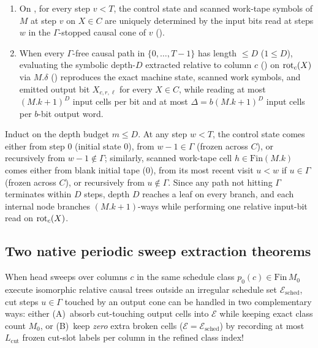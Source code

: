 \begin{lemma}\label{lem:tm-cut-cone}
\begin{enumerate}[label=(\alph*)]
\item On , for every step $v < T$, the control state and scanned
  work-tape symbols of $M$ at step $v$ on $X \in C$ are uniquely determined by the input bits read
  at steps $w$ in the $\Gamma$-stopped causal cone of $v$ ().
\item When every $\Gamma$-free causal path in $\{0,\dots,T-1\}$ has length $\le D$ ($1 \le D$),
  evaluating the symbolic depth-$D$  extracted relative to column $c$
  () on $\operatorname{rot}_c(X)$ via $M.\delta$ () reproduces the exact
  machine state, scanned work symbols, and emitted output bit $X_{c,r,\ell}$ for every $X \in C$,
  while reading at most $(M.k + 1)^D$ input cells per bit and at most
  $\Delta = b(M.k + 1)^D$ input cells per $b$-bit output word.
\end{enumerate}
\end{lemma}
\begin{outline}
Induct on the depth budget $m \le D$. At any step $w < T$, the control state comes either from step
$0$ (initial state $0$), from $w - 1 \in \Gamma$ (frozen across $C$), or recursively from $w - 1
\notin \Gamma$; similarly, scanned work-tape cell $h \in \mathrm{Fin}(M.k)$ comes either from blank
initial tape ($0$), from its most recent visit $u < w$ if $u \in \Gamma$ (frozen across $C$), or
recursively from $u \notin \Gamma$. Since any path not hitting $\Gamma$ terminates within $D$ steps,
depth $D$ reaches a leaf on every branch, and each internal node branches $(M.k + 1)$-ways while
performing one relative input-bit read on $\operatorname{rot}_c(X)$.
\end{outline}

\subsection{Two native periodic sweep extraction theorems}\label{sec:sweep-theorems}

When head sweeps over columns $c$ in the same schedule class $p_0(c) \in \mathrm{Fin}\,M_0$ execute
isomorphic relative causal trees outside an irregular schedule set $\mathcal{E}_{\mathrm{sched}}$,
cut steps $u \in \Gamma$ touched by an output cone can be handled in two complementary ways:
either (A)~absorb cut-touching output cells into $\mathcal{E}$ while keeping exact class count
$M_0$, or (B)~keep \emph{zero} extra broken cells ($\mathcal{E} = \mathcal{E}_{\mathrm{sched}}$) by
recording at most $L_{\mathrm{cut}}$ frozen cut-slot labels per column in the refined class index!

